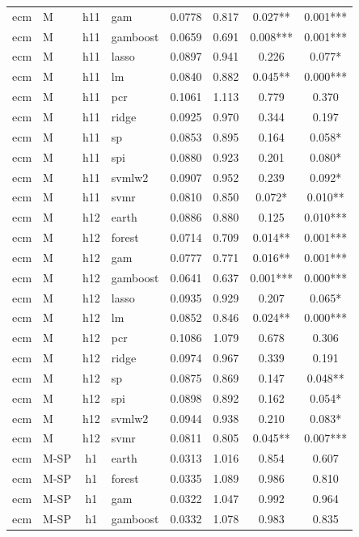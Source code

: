 \begin{ThreePartTable}
\begin{longtable}[t]{llclcccc}
ecm & M & h11 & gam & 0.0778 & 0.817 & 0.027** & 0.001***\\
ecm & M & h11 & gamboost & 0.0659 & 0.691 & 0.008*** & 0.001***\\
ecm & M & h11 & lasso & 0.0897 & 0.941 & 0.226 & 0.077*\\
ecm & M & h11 & lm & 0.0840 & 0.882 & 0.045** & 0.000***\\
ecm & M & h11 & pcr & 0.1061 & 1.113 & 0.779 & 0.370\\
ecm & M & h11 & ridge & 0.0925 & 0.970 & 0.344 & 0.197\\
ecm & M & h11 & sp & 0.0853 & 0.895 & 0.164 & 0.058*\\
ecm & M & h11 & spi & 0.0880 & 0.923 & 0.201 & 0.080*\\
ecm & M & h11 & svmlw2 & 0.0907 & 0.952 & 0.239 & 0.092*\\
ecm & M & h11 & svmr & 0.0810 & 0.850 & 0.072* & 0.010**\\
\addlinespace
ecm & M & h12 & earth & 0.0886 & 0.880 & 0.125 & 0.010***\\
ecm & M & h12 & forest & 0.0714 & 0.709 & 0.014** & 0.001***\\
ecm & M & h12 & gam & 0.0777 & 0.771 & 0.016** & 0.001***\\
ecm & M & h12 & gamboost & 0.0641 & 0.637 & 0.001*** & 0.000***\\
ecm & M & h12 & lasso & 0.0935 & 0.929 & 0.207 & 0.065*\\
ecm & M & h12 & lm & 0.0852 & 0.846 & 0.024** & 0.000***\\
ecm & M & h12 & pcr & 0.1086 & 1.079 & 0.678 & 0.306\\
ecm & M & h12 & ridge & 0.0974 & 0.967 & 0.339 & 0.191\\
ecm & M & h12 & sp & 0.0875 & 0.869 & 0.147 & 0.048**\\
ecm & M & h12 & spi & 0.0898 & 0.892 & 0.162 & 0.054*\\
ecm & M & h12 & svmlw2 & 0.0944 & 0.938 & 0.210 & 0.083*\\
ecm & M & h12 & svmr & 0.0811 & 0.805 & 0.045** & 0.007***\\
\addlinespace
ecm & M-SP & h1 & earth & 0.0313 & 1.016 & 0.854 & 0.607\\
ecm & M-SP & h1 & forest & 0.0335 & 1.089 & 0.986 & 0.810\\
ecm & M-SP & h1 & gam & 0.0322 & 1.047 & 0.992 & 0.964\\
ecm & M-SP & h1 & gamboost & 0.0332 & 1.078 & 0.983 & 0.835\\

\end{longtable}
\end{ThreePartTable}
